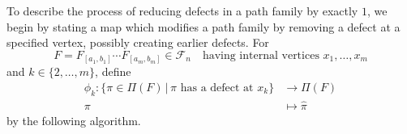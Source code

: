 \documentclass[12pt]{amsart}
\theoremstyle{definition}
\numberwithin{equation}{section}
\newcommand{\ctr}[1]{{x}_{#1}}
\newcommand{\ocnet}[1]{\mathcal F_{#1}}%
\begin{document}
To describe the process of reducing defects in a path family by exactly $1$, we begin
by stating a map which modifies a path family by removing a defect at a specified vertex,
possibly creating earlier defects.
For 
\begin{equation}\label{eq:starnetwork}
    F = F_{[a_1,b_1]} \cdots F_{[a_m,b_m]} \in \ocnet n \quad \text{having internal vertices } \ctr 1, \dotsc, \ctr m
\end{equation}
and $k\in\{2, \dotsc, m\}$, 
define
\begin{equation}\label{eq:phidef}
\begin{aligned}
    \phi_k : \{\pi \in \Pi(F) \,|\, \pi \text{ has a defect at } x_k
    \} &\rightarrow \Pi(F)\\
    \pi &\mapsto \hat \pi\end{aligned}
    \end{equation}
by the following algorithm.
\end{document}
